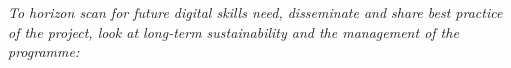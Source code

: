 \documentclass[conference]{IEEEtran}
\begin{document}
{\emph{To horizon scan for future digital skills need, disseminate and
share best practice of the project, look at long-term sustainability
and the management of the programme:}}




\end{document}
